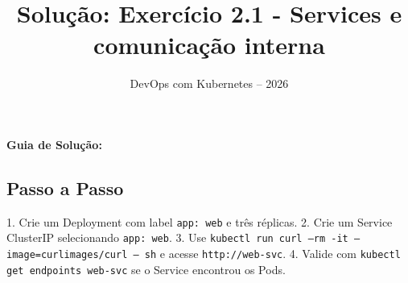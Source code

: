 \documentclass[11pt,a4paper]{article}
\title{\color{secondary}\Huge\textbf{Solução: Exercício 2.1 - Services e comunicação interna}}
\author{\color{primary}DevOps com Kubernetes -- 2026}
\date{}
\begin{document}
\maketitle


\textbf{Guia de Solução:}

\subsection*{\color{secondary}Passo a Passo}

1. Crie um Deployment com label \texttt{app: web} e três réplicas.
2. Crie um Service ClusterIP selecionando \texttt{app: web}.
3. Use \texttt{kubectl run curl --rm -it --image=curlimages/curl -- sh} e acesse \texttt{http://web-svc}.
4. Valide com \texttt{kubectl get endpoints web-svc} se o Service encontrou os Pods.
\end{document}
